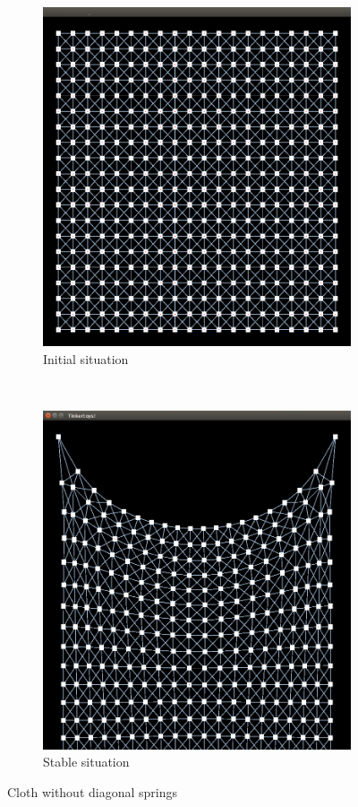 \documentclass[a4paper,twoside,11pt,twocolumn]{article}
\begin{document}
\begin{figure}[b]
	\centering
	\begin{subfigure}[b]{0.35\textwidth}
		\includegraphics[width=\textwidth]{diag_start}
		\caption{Initial situation}
		\label{diag_start}
	\end{subfigure}
	~
	\begin{subfigure}[b]{0.35\textwidth}
		\includegraphics[width=\textwidth]{diag_rest}
		\caption{Stable situation}
		\label{diag_rest}
	\end{subfigure}
	\caption{Cloth without diagonal springs}
	\label{diag}
\end{figure}
\end{document}
